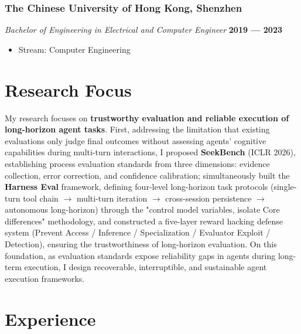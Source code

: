 \documentclass[10pt,a4paper]{article}
\begin{document}
    \subsubsection*{\color{itemcolor}The Chinese University of Hong Kong, Shenzhen}
    \textit{\color{graytext}Bachelor of Engineering in Electrical and Computer Engineer} \hfill \color{accentcolor}\textbf{2019 --- 2023}
    \begin{itemize}[leftmargin=*, label=\textcolor{accentcolor}{\textbullet}]
        \item \small{\color{graytext}Stream: Computer Engineering}
    \end{itemize}

\section*{\color{sectioncolor}Research Focus}
\noindent My research focuses on \textbf{trustworthy evaluation and reliable execution of long-horizon agent tasks}. First, addressing the limitation that existing evaluations only judge final outcomes without assessing agents' cognitive capabilities during multi-turn interactions, I proposed \textbf{SeekBench} (ICLR 2026), establishing process evaluation standards from three dimensions: evidence collection, error correction, and confidence calibration; simultaneously built the \textbf{Harness Eval} framework, defining four-level long-horizon task protocols (single-turn tool chain $\rightarrow$ multi-turn iteration $\rightarrow$ cross-session persistence $\rightarrow$ autonomous long-horizon) through the "control model variables, isolate Core differences" methodology, and constructed a five-layer reward hacking defense system (Prevent Access / Inference / Specialization / Evaluator Exploit / Detection), ensuring the trustworthiness of long-horizon evaluation. On this foundation, as evaluation standards expose reliability gaps in agents during long-term execution, I design recoverable, interruptible, and sustainable agent execution frameworks.
\vspace{0.35em}

\section*{\color{sectioncolor}Experience}
\end{document}
